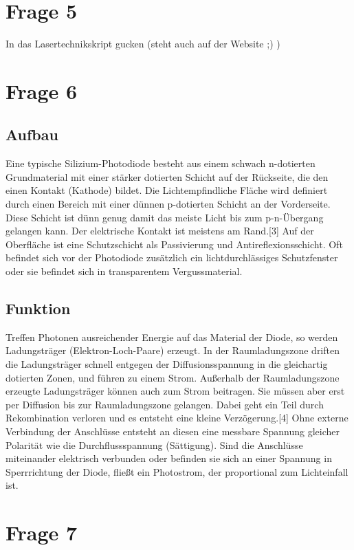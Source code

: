 \section{Frage 5}

In das Lasertechnikskript gucken (steht auch auf der Website ;) )


\section{Frage 6}

\subsection*{Aufbau}

Eine typische Silizium-Photodiode besteht aus einem schwach n-dotierten Grundmaterial mit einer stärker dotierten Schicht auf der Rückseite, die den einen Kontakt (Kathode) bildet. Die Lichtempfindliche Fläche wird definiert durch einen Bereich mit einer dünnen p-dotierten Schicht an der Vorderseite. Diese Schicht ist dünn genug damit das meiste Licht bis zum p-n-Übergang gelangen kann. Der elektrische Kontakt ist meistens am Rand.[3] Auf der Oberfläche ist eine Schutzschicht als Passivierung und Antireflexionsschicht. Oft befindet sich vor der Photodiode zusätzlich ein lichtdurchlässiges Schutzfenster oder sie befindet sich in transparentem Vergussmaterial.

\subsection*{Funktion}

Treffen Photonen ausreichender Energie auf das Material der Diode, so werden Ladungsträger (Elektron-Loch-Paare) erzeugt. In der Raumladungszone driften die Ladungsträger schnell entgegen der Diffusionsspannung in die gleichartig dotierten Zonen, und führen zu einem Strom. Außerhalb der Raumladungszone erzeugte Ladungsträger können auch zum Strom beitragen. Sie müssen aber erst per Diffusion bis zur Raumladungszone gelangen. Dabei geht ein Teil durch Rekombination verloren und es entsteht eine kleine Verzögerung.[4] Ohne externe Verbindung der Anschlüsse entsteht an diesen eine messbare Spannung gleicher Polarität wie die Durchflussspannung (Sättigung). Sind die Anschlüsse miteinander elektrisch verbunden oder befinden sie sich an einer Spannung in Sperrrichtung der Diode, fließt ein Photostrom, der proportional zum Lichteinfall ist.


\section{Frage 7}

